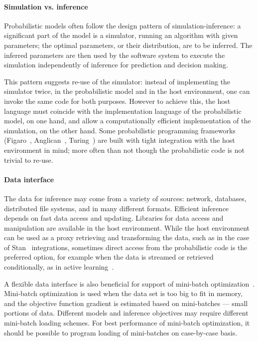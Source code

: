 \documentclass[sigplan,review,10pt,anonymous]{acmart}
\begin{document}
\begin{sloppypar}
\paragraph{Simulation vs. inference} Probabilistic models often
follow the design pattern of simulation-inference: a significant
part of the model is a simulator, running an algorithm with
given parameters; the optimal parameters, or their distribution,
are to be inferred. The inferred parameters are then used by the
software system to execute the simulation independently of
inference for prediction and decision making.

This pattern suggests re-use of the simulator: instead of
implementing the simulator twice, in the probabilistic model and
in the host environment, one can invoke the same code for both
purposes.  However to achieve this, the host language must
coincide with the implementation language of the probabilistic
model, on one hand, and allow a computationally efficient
implementation of the simulation, on the other hand. Some
probabilistic programming frameworks (Figaro~\cite{P09},
Anglican~\cite{TMY+16}, Turing~\cite{GXG18}) are built with
tight integration with the host environment in mind; more often
than not though the probabilistic code is not trivial to re-use.

\paragraph{Data interface} The data for inference may come from
a variety of sources: network, databases, distributed file
systems, and in many different formats. Efficient inference
depends on fast data access and updating. Libraries for data
access and manipulation are available in the host environment.
While the host environment can be used as a proxy retrieving and
transforming the data, such as in the case of Stan~\cite{Stan17}
integrations, sometimes direct access from the probabilistic
code is the preferred option, for example when the data is
streamed or retrieved conditionally, as in active
learning~\cite{SLB15}.

A flexible data interface is also beneficial for support of
mini-batch optimization~\cite{LZC+14}. Mini-batch optimization
is used when the data set is too big to fit in memory, and the
objective function gradient is estimated based on mini-batches
--- small portions of data. Different models and inference
objectives may require different mini-batch loading schemes.
For best performance of mini-batch optimization, it should be
possible to program loading of mini-batches on case-by-case
basis.


\end{sloppypar}
\end{document}
